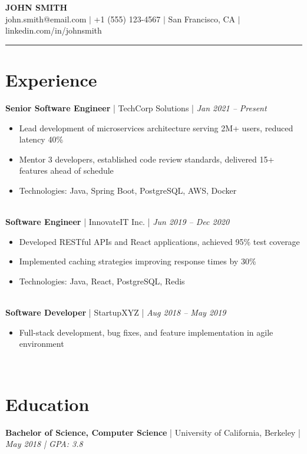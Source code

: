 \documentclass[11pt,a4paper]{article}
\newcommand{\job}[4]{\textbf{#1} | #2 | \textit{#3}\\[2pt] #4\\[8pt]}
\newcommand{\education}[3]{\textbf{#1} | #2 | \textit{#3}}
\begin{document}
\begin{center}
    {\Large \textbf{JOHN SMITH}}\\[4pt]
    john.smith@email.com $|$ +1 (555) 123-4567 $|$ San Francisco, CA $|$ linkedin.com/in/johnsmith\\
    \rule{\textwidth}{0.5pt}
\end{center}
\vspace{8pt}

\section{Experience}

\job{Senior Software Engineer}{TechCorp Solutions}{Jan 2021 -- Present}{
\begin{itemize}[leftmargin=12pt, itemsep=1pt, parsep=0pt]
    \item Lead development of microservices architecture serving 2M+ users, reduced latency 40\%
    \item Mentor 3 developers, established code review standards, delivered 15+ features ahead of schedule
    \item Technologies: Java, Spring Boot, PostgreSQL, AWS, Docker
\end{itemize}
}

\job{Software Engineer}{InnovateIT Inc.}{Jun 2019 -- Dec 2020}{
\begin{itemize}[leftmargin=12pt, itemsep=1pt, parsep=0pt]
    \item Developed RESTful APIs and React applications, achieved 95\% test coverage
    \item Implemented caching strategies improving response times by 30\%
    \item Technologies: Java, React, PostgreSQL, Redis
\end{itemize}
}

\job{Software Developer}{StartupXYZ}{Aug 2018 -- May 2019}{
\begin{itemize}[leftmargin=12pt, itemsep=1pt, parsep=0pt]
    \item Full-stack development, bug fixes, and feature implementation in agile environment
\end{itemize}
}



\section{Education}

\education{Bachelor of Science, Computer Science}{University of California, Berkeley}{May 2018 | GPA: 3.8}
\end{document}
